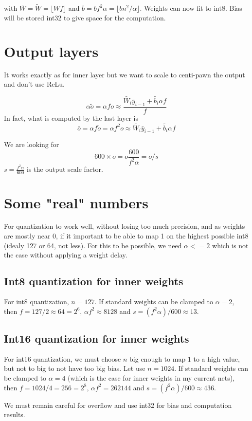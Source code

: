 \documentclass{article}
\begin{document}
with $\bar{W} = \tilde{W} = \lfloor Wf \rfloor$ and $\bar{b} = bf^2\alpha = \lfloor b n^2/\alpha \rfloor$.  Weights can now fit to int8. Bias will be stored int32 to give space for the computation.

\section{Output layers}

It works exactly as for inner layer but we want to scale to centi-pawn the output and don't use ReLu.

$$\alpha \tilde{o} = \alpha f o \approx \frac{\tilde{W_i} \bar{y}_{i-1} + \tilde{b_i}\alpha f}{f}$$
In fact, what is computed by the last layer is
$$\bar{o} = \alpha f \tilde{o} = \alpha f^2 o \approx\tilde{W_i} \bar{y}_{i-1} + \tilde{b_i}\alpha f$$

We are looking for 
$$600\times o = \bar{o} \frac{600}{f^2\alpha} = \bar{o}/s$$
$s = \frac{f^2\alpha}{600}$ is the output scale factor.

\section{Some "real" numbers}

For quantization to work well, without losing too much precision, and as weights are mostly near 0, if it important to be able to map 1 on the highest possible int8 (idealy 127 or 64, not less). For this to be possible, we need $\alpha <=2$ which is not the case without applying a weight delay.

\subsection{Int8 quantization for inner weights}
For int8 quantization, $n=127$. If standard weights can be clamped to $\alpha = 2$, then $f = 127/2 \approx 64 = 2^6$, $\alpha f^2 \approx 8128$ and $s = (f^2\alpha)/600 \approx 13$.

\subsection{Int16 quantization for inner weights}
For int16 quantization, we must choose $n$ big enough to map 1 to a high value, but not to big to not have too big bias. Let use $n=1024$. If standard weights can be clamped to $\alpha = 4$ (which is the case for inner weights in my current nets), then $f = 1024/4 = 256 = 2^8$, $\alpha f^2 = 262144$ and $s = (f^2\alpha)/600 \approx 436$.

We must remain careful for overflow and use int32 for bias and computation results.
\end{document}
